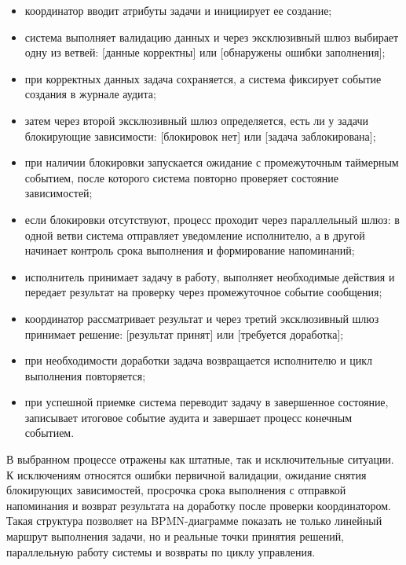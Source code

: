 \begin{itemize}
\item координатор вводит атрибуты задачи и инициирует ее создание;
\item система выполняет валидацию данных и через эксклюзивный шлюз выбирает одну из ветвей: [данные корректны] или [обнаружены ошибки заполнения];
\item при корректных данных задача сохраняется, а система фиксирует событие создания в журнале аудита;
\item затем через второй эксклюзивный шлюз определяется, есть ли у задачи блокирующие зависимости: [блокировок нет] или [задача заблокирована];
\item при наличии блокировки запускается ожидание с промежуточным таймерным событием, после которого система повторно проверяет состояние зависимостей;
\item если блокировки отсутствуют, процесс проходит через параллельный шлюз: в одной ветви система отправляет уведомление исполнителю, а в другой начинает контроль срока выполнения и формирование напоминаний;
\item исполнитель принимает задачу в работу, выполняет необходимые действия и передает результат на проверку через промежуточное событие сообщения;
\item координатор рассматривает результат и через третий эксклюзивный шлюз принимает решение: [результат принят] или [требуется доработка];
\item при необходимости доработки задача возвращается исполнителю и цикл выполнения повторяется;
\item при успешной приемке система переводит задачу в завершенное состояние, записывает итоговое событие аудита и завершает процесс конечным событием.
\end{itemize}

В выбранном процессе отражены как штатные, так и исключительные ситуации. К исключениям относятся ошибки первичной валидации, ожидание снятия блокирующих зависимостей, просрочка срока выполнения с отправкой напоминания и возврат результата на доработку после проверки координатором. Такая структура позволяет на BPMN-диаграмме показать не только линейный маршрут выполнения задачи, но и реальные точки принятия решений, параллельную работу системы и возвраты по циклу управления.
